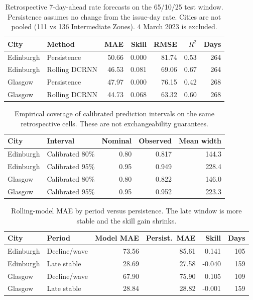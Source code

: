 
\begin{table}[t]
  \caption{Retrospective 7-day-ahead rate forecasts on the 65/10/25 test window. Persistence assumes no change from the issue-day rate. Cities are not pooled (111 vs 136 Intermediate Zones). 4 March 2023 is excluded.}
  \label{tab:forecast}
  \small
  \centering
  \begin{tabular}{llrrrrr}
    \toprule
    City & Method & MAE & Skill & RMSE & $R^2$ & Days \\
    \midrule
    Edinburgh & Persistence & 50.66 & 0.000 & 81.74 & 0.53 & 264 \\
    Edinburgh & Rolling DCRNN & 46.53 & 0.081 & 69.06 & 0.67 & 264 \\
    Glasgow & Persistence & 47.97 & 0.000 & 76.15 & 0.42 & 268 \\
    Glasgow & Rolling DCRNN & 44.73 & 0.068 & 63.32 & 0.60 & 268 \\
    \bottomrule
  \end{tabular}
\end{table}

\begin{table}[t]
  \caption{Empirical coverage of calibrated prediction intervals on the same retrospective cells. These are not exchangeability guarantees.}
  \label{tab:intervals}
  \small
  \centering
  \begin{tabular}{llrrr}
    \toprule
    City & Interval & Nominal & Observed & Mean width \\
    \midrule
    Edinburgh & Calibrated 80\% & 0.80 & 0.817 & 144.3 \\
    Edinburgh & Calibrated 95\% & 0.95 & 0.949 & 228.4 \\
    Glasgow & Calibrated 80\% & 0.80 & 0.822 & 146.0 \\
    Glasgow & Calibrated 95\% & 0.95 & 0.952 & 223.3 \\
    \bottomrule
  \end{tabular}
\end{table}

\begin{table}[t]
  \caption{Rolling-model MAE by period versus persistence. The late window is more stable and the skill gain shrinks.}
  \label{tab:period}
  \small
  \centering
  \begin{tabular}{llrrrr}
    \toprule
    City & Period & Model MAE & Persist.\ MAE & Skill & Days \\
    \midrule
    Edinburgh & Decline/wave & 73.56 & 85.61 & 0.141 & 105 \\
    Edinburgh & Late stable & 28.69 & 27.58 & -0.040 & 159 \\
    Glasgow & Decline/wave & 67.90 & 75.90 & 0.105 & 109 \\
    Glasgow & Late stable & 28.84 & 28.82 & -0.001 & 159 \\
    \bottomrule
  \end{tabular}
\end{table}

